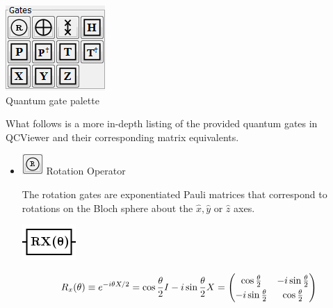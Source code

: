 \documentclass[10pt]{article}
\theoremstyle{definition}
\begin{document}
\begin{center}
\includegraphics{Figures/Gates/Gates.png}\\
Quantum gate palette
\end{center}

What follows is a more in-depth listing of the provided quantum gates in QCViewer and their corresponding matrix equivalents. 

\begin{itemize}
\item \includegraphics{Figures/Gates/RotationGate.png}  Rotation Operator

The rotation gates are exponentiated Pauli matrices that correspond to rotations on the Bloch sphere about the $\hat{x}, \hat{y}$ or $\hat{z}$ axes.

\begin{center}
\includegraphics[scale=.7]{Figures/Gates/RotXGateViewer} 
  \begin{minipage}{.9\linewidth}
    \begin{equation*} \label{mat:Swap}
    \renewcommand{\arraystretch}{1.25}
 R_x(\theta) \equiv e^{-i\theta X/2} = \cos\frac{\theta}{2} I - i \sin \frac{\theta}{2} X =  \begin{pmatrix} \cos \frac{\theta}{2} & -i\sin\frac{\theta}{2} \\ -i\sin\frac{\theta}{2} & \cos\frac{\theta}{2}\end{pmatrix}
    \end{equation*}
  \end{minipage}\hspace{-2.5cm}
  \begin{minipage}{.2\linewidth}
  \vspace*{3pt}
    \begin{align}
    \end{align}
  \end{minipage}
\end{center}


\end{itemize}
\end{document}
